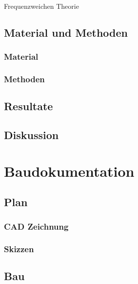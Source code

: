 \documentclass[a4paper,11pt]{report}
\begin{document}
Frequenzweichen Theorie

\chapter{Material und Methoden}
\section{Material}

\section{Methoden}
\chapter{Resultate}
\chapter{Diskussion}

\part{Baudokumentation}

\chapter{Plan}
\section{CAD Zeichnung}
\section{Skizzen}

\chapter{Bau}
\end{document}
